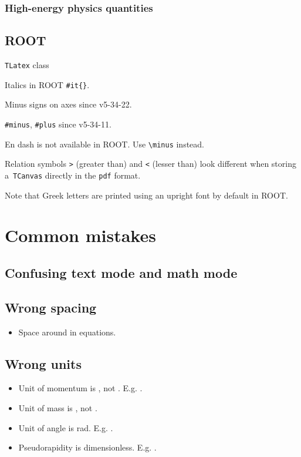 \documentclass[12pt,a4paper]{article}
\begin{document}
\subsubsection{High-energy physics quantities}

\subsection{ROOT}

\verb_TLatex_ class

Italics in ROOT \verb!#it{}!.

Minus signs on axes since v5-34-22.

\verb!#minus!, \verb!#plus! since v5-34-11.

En dash is not available in ROOT. Use \verb_\minus_ instead.

Relation symbols \verb_>_ (greater than) and \verb_<_ (lesser than) look different when storing a~\verb_TCanvas_ directly in the \texttt{pdf} format.

Note that Greek letters are printed using an upright font by default in ROOT.

\section{Common mistakes}

\subsection{Confusing text mode and math mode}

\subsection{Wrong spacing}

\begin{itemize}
\item Space around \qm{\ml{/}} in equations.
\end{itemize}

\subsection{Wrong units}

\begin{itemize}
\item Unit of momentum is \si{\gevc}, not \si{\gev}. E.g. .
\item Unit of mass is \si{\gevcc}, not \si{\gev}.
\item Unit of angle is \unit{\radian}. E.g. .
\item Pseudorapidity is dimensionless. E.g. .
\end{itemize}
\end{document}
